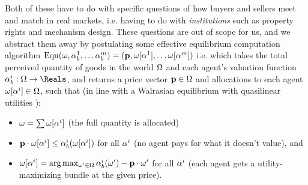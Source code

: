 Both of these have to do with specific questions of how buyers and sellers meet and match in real markets, i.e. having to do with \emph{institutions} such as property rights and mechanism design. These questions are out of scope for us, and we abstract them away by postulating some effective equilibrium computation algorithm $\operatorname{Equ}(\omega,{\alpha}_b^1,\dots{\alpha}_b^m)=(\mathbf{p}, \omega[\alpha^1],\dots\omega[\alpha^m])$ i.e. which takes the total perceived quantity of goods in the world $\Omega$ and each agent's valuation function $\agentbid^i:\obss\to\Reals$, and returns a price vector $\mathbf{p}\in\Omega$ and allocations to each agent $\omega[\alpha^i]\in\Omega$, such that (in line with a Walrasian equilibrium with quasilinear utilities \cite{millerNotesMicroeconomicTheory2006}):
\begin{itemize}
    \item $\omega=\sum\omega[\alpha^i]$ (the full quantity is allocated)
    \item $\mathbf{p}\cdot\omega[\alpha^i]\le{\alpha}_b^i(\omega[\alpha^i])$ for all $\alpha^i$ (no agent pays for what it doesn't value), and
    \item $\omega[\alpha^i]=\arg\max_{\omega'\in\Omega}{\alpha}_b^i(\omega')-\mathbf{p}\cdot\omega'$ for all $\alpha^i$ (each agent gets a utility-maximizing bundle at the given price).
\end{itemize}



